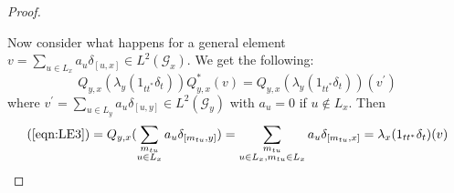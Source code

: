 \begin{proof}
\begin{figure}
\end{figure}

Now consider what happens for a general element $v = \sum_{u \in L_{x}} a_{u}\delta_{[u,x]} \in L^{2}(\mathcal{G}_{x})$. We get the following:
\begin{equation}\label{eqn:LE3}
Q_{y,x}(\lambda_{y}(1_{tt^{*}}\delta_{t}))Q_{y,x}^{*}(v)=Q_{y,x}(\lambda_{y}(1_{tt^{*}}\delta_{t}))(v^{'})
\end{equation}
where $v^{'}= \sum_{u \in L_{y}} a_{u}\delta_{[u,y]} \in L^{2}(\mathcal{G}_{y})$ with $a_{u}=0$ if $u \not \in L_{x}$. Then 
\begin{eqnarray*}
\mbox{(\ref{eqn:LE3})} = Q_{y,x}(\sum_{\substack{ m_{tu}\\ u \in L_{x}}} a_{u}\delta_{[m_{tu},y]})
=\sum_{\substack{ m_{tu}\\  u \in L_{x},m_{tu} \in L_{x}}}a_{u}\delta_{[m_{tu},x]}=\lambda_{x}(1_{tt^{*}}\delta_{t})(v)
\end{eqnarray*}
\end{proof}

